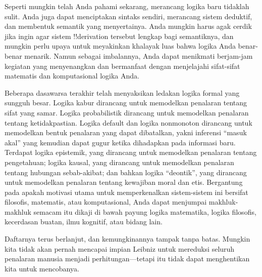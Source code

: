 \documentclass[../../../include/open-logic-section]{subfiles}
\begin{document}


Seperti mungkin telah Anda pahami sekarang, merancang logika baru tidaklah
sulit. Anda juga dapat menciptakan sintaks sendiri, merancang sistem deduktif,
dan membentuk semantik yang menyertainya. Anda mungkin harus agak cerdik jika
ingin agar sistem !!{derivation} tersebut lengkap bagi semantiknya, dan
mungkin perlu upaya untuk meyakinkan khalayak luas bahwa logika Anda
benar-benar menarik. Namun sebagai imbalannya, Anda dapat menikmati
berjam-jam kegiatan yang menyenangkan dan bermanfaat dengan menjelajahi
sifat-sifat matematis dan komputasional logika Anda.

Beberapa dasawarsa terakhir telah menyaksikan ledakan logika formal yang
sungguh besar. Logika kabur dirancang untuk memodelkan penalaran tentang sifat
yang samar. Logika probabilistik dirancang untuk memodelkan penalaran tentang
ketidakpastian. Logika default dan logika nonmonoton dirancang untuk memodelkan
bentuk penalaran yang dapat dibatalkan, yakni inferensi ``masuk akal'' yang
kemudian dapat gugur ketika dihadapkan pada informasi baru. Terdapat logika
epistemik, yang dirancang untuk memodelkan penalaran tentang pengetahuan;
logika kausal, yang dirancang untuk memodelkan penalaran tentang hubungan
sebab-akibat; dan bahkan logika ``deontik'', yang dirancang untuk memodelkan
penalaran tentang kewajiban moral dan etis. Bergantung pada apakah motivasi
utama untuk memperkenalkan sistem-sistem ini bersifat filosofis, matematis,
atau komputasional, Anda dapat menjumpai makhluk-makhluk semacam itu dikaji di
bawah payung logika matematika, logika filosofis, kecerdasan buatan, ilmu
kognitif, atau bidang lain.

Daftarnya terus berlanjut, dan kemungkinannya tampak tanpa batas. Mungkin kita
tidak akan pernah mencapai impian Leibniz untuk mereduksi seluruh penalaran
manusia menjadi perhitungan---tetapi itu tidak dapat menghentikan kita untuk
mencobanya.
\end{document}
